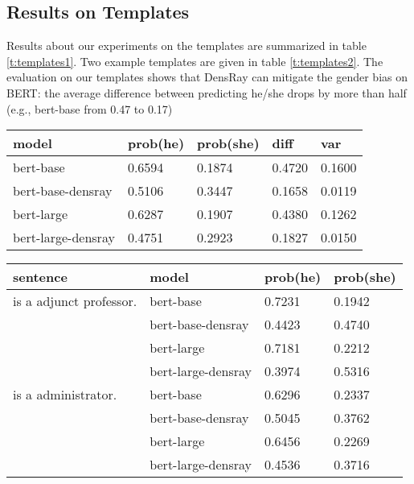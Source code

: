 \subsection{Results on Templates}
Results about our experiments on the templates are summarized in table \ref{t:templates1}. Two example templates are given in table \ref{t:templates2}. The evaluation on our templates shows that DensRay can mitigate the gender bias on BERT: the average difference between predicting he/she drops by more than half (e.g., bert-base from 0.47 to 0.17)
\begin{table*}[ht]
\centering
\footnotesize
\begin{tabular}{lllll}
\hline
model & prob(he) & prob(she) & diff & var\\
\hline
bert-base & 0.6594 & 0.1874 & 0.4720 & 0.1600 \\
bert-base-densray & 0.5106 & 0.3447 & {0.1658} & 0.0119\\
\hline
bert-large  & 0.6287 & 0.1907 & 0.4380 & 0.1262 \\
bert-large-densray  & 0.4751 & 0.2923 & {0.1827} & 0.0150\\
\hline
\end{tabular}
\caption{  \label{t:templates1}
BERT debiasing results on templates. \textit{bert-base} and \textit{bert-large} are the original model without debiasing. \textit{prob(he)} is the mean probability that model predict \textit{he} as the [MASK]in all templates. \textit{var} is the variance of the differences between the probability of BERT predicts [MASK] as \textit{he} and \textit{she}.}
\end{table*}
\begin{table*}[ht]
\centering
\footnotesize
\begin{tabular}{llll}
\hline
sentence & model & prob(he) & prob(she)\\
\hline
[MASK] is a adjunct professor. & bert-base & 0.7231 & 0.1942\\
 & bert-base-densray & 0.4423 & 0.4740\\
 & bert-large & 0.7181 & 0.2212\\
 & bert-large-densray & 0.3974 & 0.5316\\
\hline
[MASK] is a administrator. & bert-base & 0.6296 & 0.2337\\
 & bert-base-densray & 0.5045 & 0.3762\\
 & bert-large & 0.6456 & 0.2269\\
 & bert-large-densray & 0.4536 & 0.3716\\
\hline
\end{tabular}
\caption{\label{t:templates2}
Two example templates with prediction probabilities.}
\end{table*}

